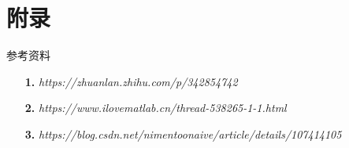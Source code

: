 \section{附录}
参考资料
\begin{itemize}
    \item [\textbf{1.}] \textit{https://zhuanlan.zhihu.com/p/342854742}
    \item [\textbf{2.}] \textit{https://www.ilovematlab.cn/thread-538265-1-1.html}
    \item [\textbf{3.}] \textit{https://blog.csdn.net/nimentoonaive/article/details/107414105}
\end{itemize} 